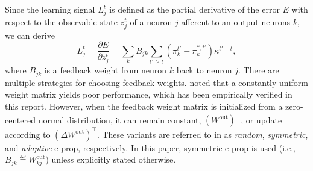             Since the learning signal $L^t_j$ is defined as the partial derivative of the error $E$ with respect to the observable state $z_j^t$ of a neuron $j$ afferent to an output neurons $k$, we can derive
            \begin{equation}\label{eq:learningsignal_after_output}
            L^t_j = \frac{\partial E}{\partial z^t_j} = \sum_kB_{jk}\sum_{t'\geq t}\left(\pi^{t'}_k - \pi^{*,t'}_k\right)\kappa^{t'-t},
            \end{equation}
            where $B_{jk}$ is a feedback weight from neuron $k$ back to neuron $j$.
            There are multiple strategies for choosing feedback weights.
            \citet{bellec2020solution} noted that a constantly uniform weight matrix yields poor performance, which has been empirically verified in this report.
            However, when the feedback weight matrix is initialized from a zero-centered normal distribution, it can remain constant, $(W^\text{out})^\top$, or update according to $(\Delta W^\text{out})^\top$.
            These variants are referred to in \citet{bellec2020solution} as \emph{random}, \emph{symmetric}, and \emph{adaptive} e-prop, respectively.
            In this paper, symmetric e-prop is used (i.e., $B_{jk} \eqdef W^\text{out}_{kj}$) unless explicitly stated otherwise.

